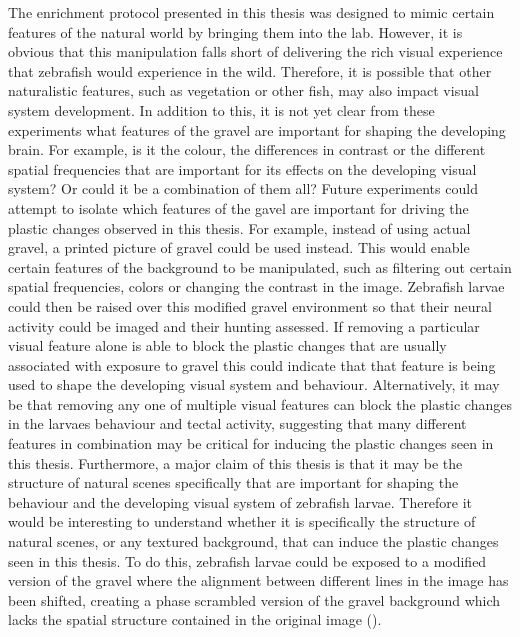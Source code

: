 The enrichment protocol presented in this thesis was designed to mimic certain features of the natural world by bringing them into the lab. However, it is obvious that this manipulation falls short of delivering the rich visual experience that zebrafish would experience in the wild. Therefore, it is possible that other naturalistic features, such as vegetation or other fish, may also impact visual system development. In addition to this, it is not yet clear from these experiments what features of the gravel are important for shaping the developing brain. For example, is it the colour, the differences in contrast or the different spatial frequencies that are important for its effects on the developing visual system? Or could it be a combination of them all? Future experiments could attempt to isolate which features of the gavel are important for driving the plastic changes observed in this thesis. For example, instead of using actual gravel, a printed picture of gravel could be used instead. This would enable certain features of the background to be manipulated, such as filtering out certain spatial frequencies, colors or changing the contrast in the image. Zebrafish larvae could then be raised over this modified gravel environment so that their neural activity could be imaged and their hunting assessed. If removing a particular visual feature alone is able to block the plastic changes that are usually associated with exposure to gravel this could indicate that that feature is being used to shape the developing visual system and behaviour. Alternatively, it may be that removing any one of  multiple visual features can block the plastic changes in the larvaes behaviour and tectal activity, suggesting that many different features in combination may be critical for inducing the plastic changes seen in this thesis. Furthermore, a major claim of this thesis is that it may be the structure of natural scenes specifically that are important for shaping the behaviour and the developing visual system of zebrafish larvae. Therefore it would be interesting to understand whether it is specifically the structure of natural scenes, or any textured background, that can induce the plastic changes seen in this thesis. To do this, zebrafish larvae could be exposed to a modified version of the gravel where the alignment between different lines in the image has been shifted, creating a phase scrambled version of the gravel background which lacks the spatial structure contained in the original image (\cite{Guo2005Centre-surroundCortex, Pecka2014Experience-DependentScenes}).  

